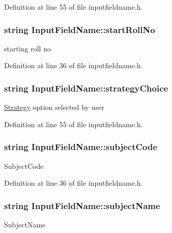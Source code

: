 Definition at line 55 of file inputfieldname.\-h.

\hypertarget{classInputFieldName_a24baf5c915b4ee0fb8678e03adec043a}{
\subsubsection[{start\-Roll\-No}]{\setlength{\rightskip}{0pt plus 5cm}string Input\-Field\-Name\-::start\-Roll\-No}}\label{classInputFieldName_a24baf5c915b4ee0fb8678e03adec043a}
starting roll no 

Definition at line 36 of file inputfieldname.\-h.

\hypertarget{classInputFieldName_a9a6b827d404cb279cc0ed836c069e4a9}{
\subsubsection[{strategy\-Choice}]{\setlength{\rightskip}{0pt plus 5cm}string Input\-Field\-Name\-::strategy\-Choice}}\label{classInputFieldName_a9a6b827d404cb279cc0ed836c069e4a9}
\hyperlink{classStrategy}{Strategy} option selected by user 

Definition at line 55 of file inputfieldname.\-h.

\hypertarget{classInputFieldName_af1cc6871c33344c365e6e25ea482bd48}{
\subsubsection[{subject\-Code}]{\setlength{\rightskip}{0pt plus 5cm}string Input\-Field\-Name\-::subject\-Code}}\label{classInputFieldName_af1cc6871c33344c365e6e25ea482bd48}
Subject\-Code 

Definition at line 36 of file inputfieldname.\-h.

\hypertarget{classInputFieldName_a0614731b959afef6bb00f9fc957e7521}{
\subsubsection[{subject\-Name}]{\setlength{\rightskip}{0pt plus 5cm}string Input\-Field\-Name\-::subject\-Name}}\label{classInputFieldName_a0614731b959afef6bb00f9fc957e7521}
Subject\-Name 

